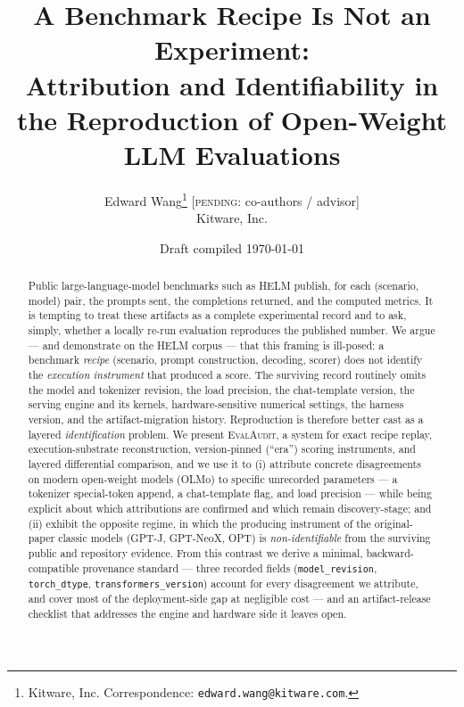 \documentclass[10pt]{article}
\title{A Benchmark Recipe Is Not an Experiment:\\
Attribution and Identifiability in the Reproduction of Open-Weight LLM Evaluations}
\author{%
  Edward Wang\thanks{Kitware, Inc. Correspondence: \texttt{edward.wang@kitware.com}.}
  \quad\textnormal{{\color{orange}\textsf{\small[\textsc{pending}: co-authors / advisor]}}}\\
  Kitware, Inc.
}
\date{Draft compiled \today}
\begin{document}
\maketitle

\begin{abstract}
Public large-language-model benchmarks such as HELM publish, for each
(scenario, model) pair, the prompts sent, the completions returned, and the
computed metrics. It is tempting to treat these artifacts as a complete
experimental record and to ask, simply, whether a locally re-run evaluation
reproduces the published number. We argue --- and demonstrate on the HELM
corpus --- that this framing is ill-posed: a benchmark \emph{recipe} (scenario,
prompt construction, decoding, scorer) does not identify the \emph{execution
instrument} that produced a score. The surviving record routinely omits the
model and tokenizer revision, the load precision, the chat-template version, the
serving engine and its kernels, hardware-sensitive numerical settings, the
harness version, and the artifact-migration history. Reproduction is therefore
better cast as a layered \emph{identification} problem. We present
\textsc{EvalAudit}, a system for exact recipe replay, execution-substrate
reconstruction, version-pinned (``era'') scoring instruments, and layered
differential comparison, and we use it to (i) attribute concrete disagreements on
modern open-weight models (OLMo) to specific unrecorded parameters --- a tokenizer
special-token append, a chat-template flag, and load precision --- while being
explicit about which attributions are confirmed and which remain discovery-stage;
and (ii) exhibit the opposite regime, in which the producing instrument of the
original-paper classic models (GPT-J, GPT-NeoX, OPT) is \emph{non-identifiable}
from the surviving public and repository evidence. From this contrast we derive a
minimal, backward-compatible provenance standard --- three recorded fields
(\texttt{model\_revision}, \texttt{torch\_dtype}, \texttt{transformers\_version})
account for every disagreement we attribute, and cover most of the
deployment-side gap at negligible cost --- and an artifact-release checklist that
addresses the engine and hardware side it leaves open.
\end{abstract}










\appendix



\end{document}
